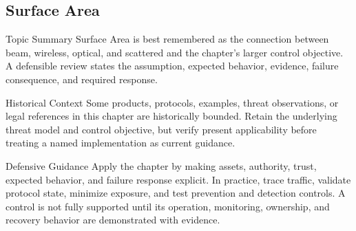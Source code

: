 \documentclass[11pt,letterpaper]{article}
\begin{document}
\subsection*{Surface Area}
\begin{CornellNotesTable}
\end{CornellNotesTable}
\begin{CornellSummaryBox}{Topic Summary}
Surface Area is best remembered as the connection between beam, wireless, optical, and scattered and the chapter's larger control objective. A defensible review states the assumption, expected behavior, evidence, failure consequence, and required response.
\end{CornellSummaryBox}
\begin{CornellWarningBox}{Historical Context}
Some products, protocols, examples, threat observations, or legal references in this chapter are historically bounded. Retain the underlying threat model and control objective, but verify present applicability before treating a named implementation as current guidance.
\end{CornellWarningBox}
\begin{CornellOverviewBox}{Defensive Guidance}
Apply the chapter by making assets, authority, trust, expected behavior, and failure response explicit. In practice, trace traffic, validate protocol state, minimize exposure, and test prevention and detection controls. A control is not fully supported until its operation, monitoring, ownership, and recovery behavior are demonstrated with evidence.
\end{CornellOverviewBox}
\end{document}
